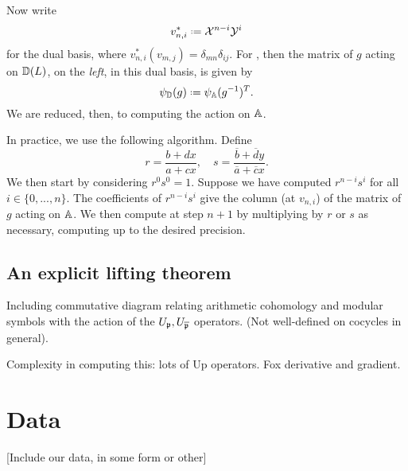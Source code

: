 \documentclass[a4paper,11pt]{article}
\numberwithin{equation}{section}
\begin{document}
Now write
\[
	v_{n,i}^* \defeq \mathcal{X}^{n-i}\mathcal{Y}^i
\]
for the dual basis, where $v_{n,i}^*(v_{m,j}) = \delta_{mn}\delta_{ij}.$ For , then the matrix of $g$ acting on $\mathbb{D}(L)$, on the \emph{left}, in this dual basis, is given by 
\[
	\psi_{\D}(g) \defeq \psi_{\A}(g^{-1})^T.
\]
We are reduced, then, to computing the action on $\mathbb{A}$.

In practice, we use the following algorithm. Define 
\[
	r = \frac{b+dx}{a+cx}, \hspace{12pt} s = \frac{\overline{b}+\overline{d}y}{\overline{a}+\overline{c}x}.
\]
We then start by considering $r^0s^0 = 1$. Suppose we have computed $r^{n-i}s^i$ for all $i \in \{0,...,n\}.$ The coefficients of $r^{n-i}s^i$ give the column (at $v_{n,i}$) of the matrix of $g$ acting on $\mathbb{A}$. We then compute at step $n+1$ by multiplying by $r$ or $s$ as necessary, computing up to the desired precision.


\subsection{An explicit lifting theorem}
Including commutative diagram relating arithmetic cohomology and modular symbols with the action of the $U_{\mathfrak{p}}, U_{\overline{\mathfrak{p}}}$ operators. (Not well-defined on cocycles in general).


Complexity in computing this: lots of Up operators. Fox derivative and gradient.


\section{Data}
[Include our data, in some form or other]


\footnotesize
\renewcommand{\refname}{\normalsize References} 
{}


\Addresses
\end{document}
